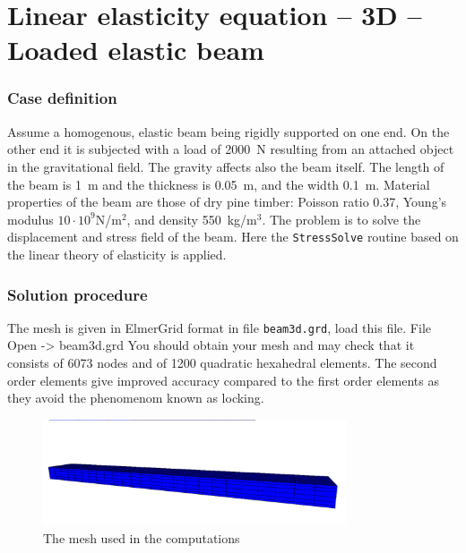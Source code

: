 \chapter{Linear elasticity equation -- 3D -- Loaded elastic beam}



\subsection*{Case definition}

Assume a homogenous, elastic beam being rigidly supported on one 
end. On the other end it is subjected with a load of 2000~N
resulting from an attached object in the gravitational field. The gravity affects also the beam itself.
The length of the beam is 1~m and the thickness is 0.05~m, and the width 
0.1~m.
Material properties of the beam are those of dry pine timber:
Poisson 
ratio 0.37, Young's modulus $10\cdot 10^9$N/m$^2$, and density 550~kg/m$^3$. 
The problem is to solve the displacement and stress field of the beam.  
Here the \texttt{StressSolve} routine based on the 
linear theory of elasticity is applied.


\subsection*{Solution procedure}

The mesh is given in ElmerGrid format in file \texttt{beam3d.grd}, load this file.
\ttbegin
File 
  Open -> beam3d.grd
\ttend
You should obtain your mesh and may check that it consists of 6073 nodes and of 
1200 quadratic hexahedral elements. The second order elements give
improved accuracy compared to the first order elements as they avoid the phenomenom known as locking.
\begin{figure}[h!]
\begin{center}
  \includegraphics[width=0.8\textwidth,viewport=0 0 1230 300,clip]{beam_mesh}
  \caption{The mesh used in the computations}
  \label{fig:elast_mesh}
\end{center}
\end{figure}

